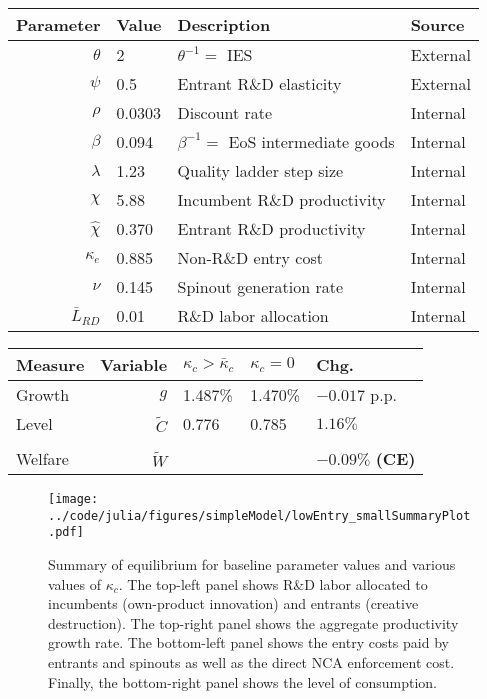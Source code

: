 \documentclass[11pt,english]{article}
\theoremstyle{definition}
\begin{document}
\begin{table}[]
	\centering
	\label{calibration_lowEntry_parameters}
	\begin{tabular}{rlll}
		\toprule \toprule
		Parameter & Value & Description & Source \tabularnewline
		\midrule
		$\theta$ & 2 & $\theta^{-1} = $ IES & External 
		\tabularnewline
		$\psi$ & 0.5 & Entrant R\&D elasticity & External \tabularnewline
		$\rho$ & 0.0303 & Discount rate  & Internal \tabularnewline
		$\beta$ & 0.094 & $\beta^{-1} = $ EoS intermediate goods & Internal \tabularnewline 
		$\lambda$ & 1.23 & Quality ladder step size & Internal 
		\tabularnewline
		$\chi$ & 5.88 & Incumbent R\&D productivity & Internal 
		\tabularnewline
		$\hat{\chi}$ & 0.370 & Entrant R\&D productivity & Internal \tabularnewline 
		$\kappa_e$ & 0.885 & Non-R\&D entry cost & Internal \tabularnewline
		$\nu$ & 0.145 & Spinout generation rate  & Internal\tabularnewline
		$\bar{L}_{RD}$ & 0.01 & R\&D labor allocation  & Internal \tabularnewline
		\bottomrule
	\end{tabular}
\end{table}

\begin{table}
	\centering
	\label{reducing_kappa_c_table_lowEntry}
	\begin{tabular}{lrlll}
		\toprule \toprule
		Measure & Variable & $\kappa_c > \bar{\kappa}_c$ & $\kappa_c = 0$ & Chg. \tabularnewline
		\midrule
		Growth & $g$ & 1.487\% & 1.470\% & $-0.017$ p.p. \tabularnewline
		Level & $\tilde{C}$  & 0.776 &  0.785 & $1.16\%$ \tabularnewline 
		\tabularnewline
		Welfare & $\tilde{W}$  &  & & $\mathbf{-0.09\%}$ \textbf{(CE)}  \tabularnewline
		\bottomrule
	\end{tabular}
\end{table}


\begin{figure}[]
	\centering
	\texttt{[image: ../code/julia/figures/simpleModel/lowEntry\_smallSummaryPlot.pdf]}
	\caption{Summary of equilibrium for baseline parameter values and various values of $\kappa_c$. The top-left panel shows R\&D labor allocated to incumbents (own-product innovation) and entrants (creative destruction). The top-right panel shows the aggregate productivity growth rate. The bottom-left panel shows the entry costs paid by entrants and spinouts as well as the direct NCA enforcement cost. Finally, the bottom-right panel shows the level of consumption.}
	\label{calibration_lowEntry_smallSummaryPlot}
\end{figure}
\end{document}
